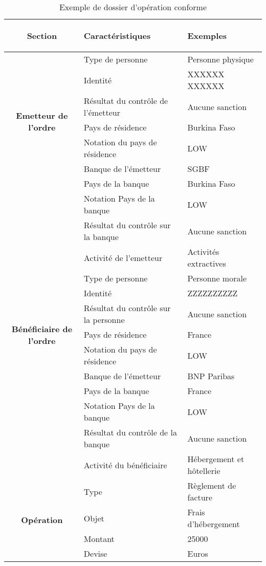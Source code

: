 

\begin{table}

  \begin{center}
    \begin{scriptsize}
      \renewcommand{\arraystretch}{2}
      \begin{tabular}{|c|l|l|}
        \hline
        \rowcolor[gray]{.7}
        \bf \rule[-0.4cm]{0mm}{1cm} Section & \bf Caractéristiques & \bf Exemples\\
        \hline
        \multirow{7}{*}{\bf Emetteur de l'ordre} & Type de personne & Personne 
        physique 
        \tabularnewline
        & Identité & XXXXXX XXXXXX \tabularnewline 
        & Résultat du contrôle de l'émetteur & Aucune sanction  \tabularnewline
        & Pays de résidence & Burkina Faso \tabularnewline
        & Notation du pays de résidence & LOW \tabularnewline
        & Banque de l’émetteur & SGBF \tabularnewline
        & Pays de la banque & Burkina Faso \tabularnewline
        & Notation Pays de la banque & LOW \tabularnewline
        & Résultat du contrôle sur la banque & Aucune sanction  \tabularnewline
        & Activité de l'emetteur & Activités extractives \tabularnewline 
        \hline

        \multirow{7}{*}{\bf Bénéficiaire de l'ordre} & Type de personne & Personne
        morale 
        \tabularnewline
        & Identité & ZZZZZZZZZZ \tabularnewline
        & Résultat du contrôle sur la personne & Aucune sanction  \tabularnewline
        & Pays de résidence & France \tabularnewline 
        & Notation du pays de résidence & LOW \tabularnewline
        & Banque de l’émetteur & BNP Paribas \tabularnewline
        & Pays de la banque & France \tabularnewline 
        & Notation Pays de la banque & LOW \tabularnewline
        & Résultat du contrôle de la banque & Aucune sanction  \tabularnewline
        & Activité du bénéficiaire & Hébergement et hôtellerie  \tabularnewline 
        \hline
        \multirow{5}{*}{\bf Opération} & Type  & Règlement de facture \tabularnewline
        & Objet  & Frais d'hébergement \tabularnewline
        & Montant& 25000 \tabularnewline
        & Devise & Euros \tabularnewline

        \hline
      \end{tabular}
    \end{scriptsize}
    \caption{Exemple de dossier d'opération conforme \label{tab:tab3}}
  \end{center}
\end{table}

